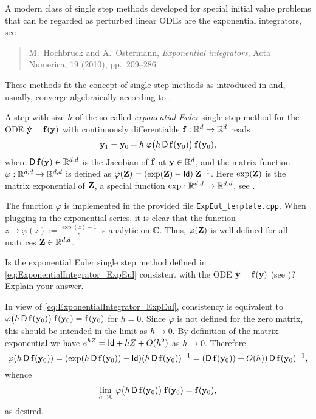 \begin{problem}\label{prb:ExponentialIntegrator}

A modern class of single step methods developed for special initial value
problems that can be regarded as perturbed linear ODEs are the exponential
integrators, see 
\begin{quote}
  {\sc M.~Hochbruck and A.~Ostermann}, {\em Exponential integrators}, Acta
  Numerica, 19 (2010), pp.~209--286.
\end{quote}
These methods fit the concept of single step methods as introduced in 
 and, usually, converge algebraically according to
.

A step with size $h$ of the so-called \textit{exponential Euler} single step
method for the ODE $\dot{{\mathbf{y}}}={\mathbf{f}}({\mathbf{y}})$ with continuously differentiable
${\mathbf{f}}:\mathbb{R}^d\rightarrow\mathbb{R}^d$ reads
\begin{equation} \label{eq:ExponentialIntegrator_ExpEul} {\mathbf{y}}_1 =
  {\mathbf{y}}_0+h\;\varphi\big(h\operatorname{\sf D}{\mathbf{f}}({\mathbf{y}}_0)\big)\:{\mathbf{f}}({\mathbf{y}}_0), \end{equation} where
$\operatorname{\sf D}{\mathbf{f}}({\mathbf{y}})\in\mathbb{R}^{d,d}$ is the Jacobian of ${\mathbf{f}}$ at ${\mathbf{y}}\in\mathbb{R}^{d}$, and the
matrix function $\varphi:\mathbb{R}^{d,d}\rightarrow\mathbb{R}^{d,d}$ is defined as
$\varphi({\mathbf{Z}}) = (\mathrm{exp}({\mathbf{Z}})-\mathsf{Id})\:{\mathbf{Z}}^{-1}$.  Here $\exp({\mathbf{Z}})$ is the
matrix exponential of ${\mathbf{Z}}$, a special function
$\exp:\mathbb{R}^{d,d}\rightarrow\mathbb{R}^{d,d}$, see . 

The function $\varphi$ is implemented in the provided file
\texttt{ExpEul\_template.cpp}. When plugging in the exponential series, it is
clear that the function $z\mapsto \varphi(z):=\frac{\exp(z)-1}{z}$ is analytic on
$\mathbb{C}$. Thus, $\varphi({\mathbf{Z}})$ is well defined for all matrices ${\mathbf{Z}}\in\mathbb{R}^{d,d}$. 



\begin{subproblem}[2] \label{subprb:ExponentialIntegrator_1}
Is the exponential Euler single step method defined in
\eqref{eq:ExponentialIntegrator_ExpEul} consistent with the ODE $\dot{{\mathbf{y}}}={\mathbf{f}}({\mathbf{y}})$
(see )? Explain your answer. 
\begin{solution}
In view of \eqref{eq:ExponentialIntegrator_ExpEul}, consistency is equivalent to $\varphi\big(h\operatorname{\sf D}{\mathbf{f}}({\mathbf{y}}_0)\big)\:{\mathbf{f}}({\mathbf{y}}_0)={\mathbf{f}}({\mathbf{y}}_0)$ for $h=0$. Since $\varphi$ is not defined for the zero matrix, this should be intended in the limit as $h\to 0$. By definition of the matrix exponential we have $e^{hZ}=\mathsf{Id}+ hZ +O(h^2)$ as $h\to 0$. Therefore
\[
\varphi(h\operatorname{\sf D}{\mathbf{f}}({\mathbf{y}}_0))= (\mathrm{exp}(h\operatorname{\sf D}{\mathbf{f}}({\mathbf{y}}_0))-\mathsf{Id})(h\operatorname{\sf D}{\mathbf{f}}({\mathbf{y}}_0))^{-1}=
 (\operatorname{\sf D}{\mathbf{f}}({\mathbf{y}}_0))+O(h))\operatorname{\sf D}{\mathbf{f}}({\mathbf{y}}_0)^{-1},
\]
whence
\[
\lim_{h\to 0}\, \varphi\big(h\operatorname{\sf D}{\mathbf{f}}({\mathbf{y}}_0)\big)\:{\mathbf{f}}({\mathbf{y}}_0)={\mathbf{f}}({\mathbf{y}}_0),
\]
as desired.
\end{solution}
\end{subproblem}


\end{problem}
